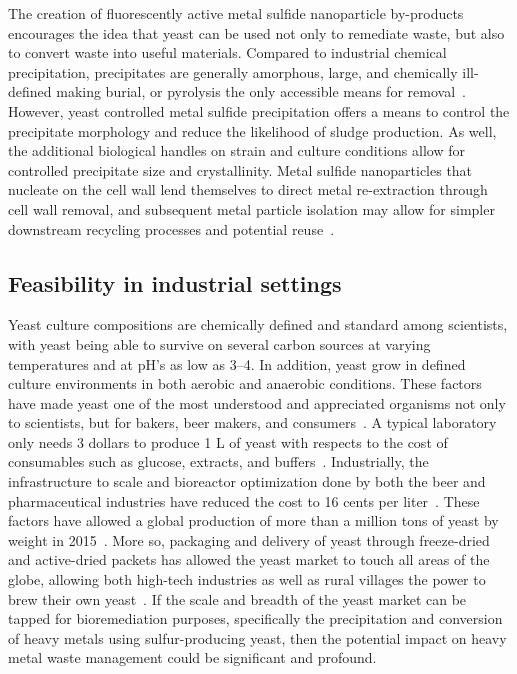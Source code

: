 \documentclass[../main/main]{subfiles}
\begin{document}
The creation of fluorescently active metal sulfide nanoparticle by-products encourages the idea that yeast can be used not only to remediate waste, but also to convert waste into useful materials. Compared to industrial chemical precipitation, precipitates are generally amorphous, large, and chemically ill-defined making burial, or pyrolysis the only accessible means for removal~\cite{kurniawan2006,kumargupta2012,bolong2009}. However, yeast controlled metal sulfide precipitation offers a means to control the precipitate morphology and reduce the likelihood of sludge production. As well, the additional biological handles on strain and culture conditions allow for controlled precipitate size and crystallinity. Metal sulfide nanoparticles that nucleate on the cell wall lend themselves to direct metal re-extraction through cell wall removal, and subsequent metal particle isolation may allow for simpler downstream recycling processes and potential reuse~\cite{kim2003}.

\subsection{Feasibility in industrial settings}
Yeast culture compositions are chemically defined and standard among scientists, with yeast being able to survive on several carbon sources at varying temperatures and at pH's as low as 3--4. In addition, yeast grow in defined culture environments in both aerobic and anaerobic conditions. These factors have made yeast one of the most understood and appreciated organisms not only to scientists, but for bakers, beer makers, and consumers~\cite{barth-haasgroup.n.d.,prnewswire.n.d.}. A typical laboratory only needs 3 dollars to produce 1 L of yeast with respects to the cost of consumables such as glucose, extracts, and buffers~\cite{harrison2015}. Industrially, the infrastructure to scale and bioreactor optimization done by both the beer and pharmaceutical industries have reduced the cost to 16 cents per liter~\cite{vieira2013,harrison2015,hoek1998}.
These factors have allowed a global production of more than a million tons of yeast by weight in 2015~\cite{bccresearch}.
More so, packaging and delivery of yeast through freeze-dried and active-dried packets has allowed the yeast market to touch all areas of the globe, allowing both high-tech industries as well as rural villages the power to brew their own yeast~\cite{prnewswire.n.d.,bccresearch}. If the scale and breadth of the yeast market can be tapped for bioremediation purposes, specifically the precipitation and conversion of heavy metals using sulfur-producing yeast, then the potential impact on heavy metal waste management could be significant and profound.
\end{document}
